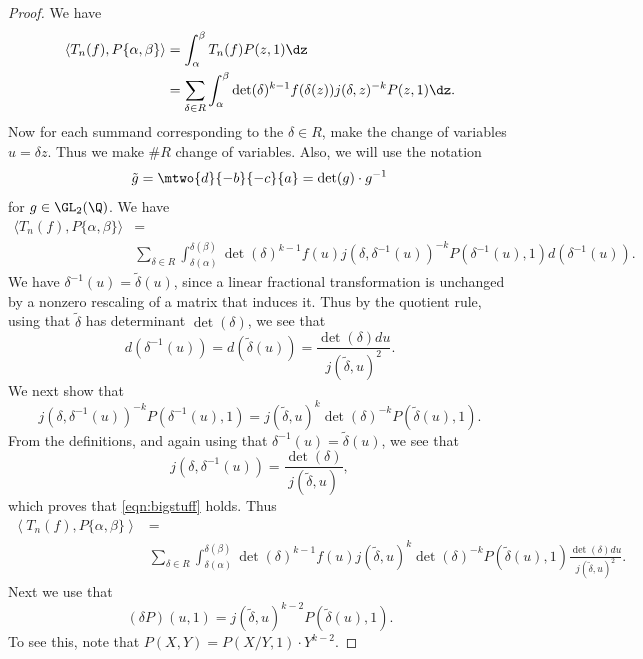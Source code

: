 \begin{proof}
We have
\begin{align*}
\langle T_n(f), P\{\alpha,\beta\}\rangle &= 
    \int_{\alpha}^{\beta} T_n(f) P(z,1) \dz\\
   &= \sum_{\delta\in R} \int_{\alpha}^{\beta}
            \det(\delta)^{k-1} f(\delta(z)) j(\delta,z)^{-k} P(z,1) \dz.
\end{align*}
Now for each summand corresponding to the $\delta\in R$,
make the change of variables $u=\delta z$.  Thus we 
make $\# R$ change of variables.  
Also, we will use the notation $$
\tilde{g} = \mtwo{\hfill{}d}{-b}{-c}{\hfill{}a}
           = \det(g)\cdot g^{-1}$$
for $g\in\GL_2(\Q)$.
We have
\begin{align*}
\langle T_n(f), P\{\alpha,\beta\}\rangle &=\\
   &\!\!\!\!\!\!\!\!\!\!\!\!\!\!\!\!\!\!\!\!
\sum_{\delta \in R}\int_{\delta(\alpha)}^{\delta(\beta)}
             \det(\delta)^{k-1} f(u) j(\delta, \delta^{-1}(u))^{-k}
             P(\delta^{-1}(u), 1) d(\delta^{-1}(u)).
\end{align*}
We have $\delta^{-1}(u) = \tilde{\delta}(u)$,
since a linear fractional transformation is unchanged
by a nonzero rescaling of a matrix that induces it.
Thus by the quotient rule, using that $\tilde{\delta}$
has determinant $\det(\delta)$, we see that
$$
   d(\delta^{-1}(u)) = d(\tilde{\delta}(u))
   = \frac{\det(\delta) du}{j(\tilde{\delta},u)^2}.
$$
We next show that
\begin{equation}\label{eqn:bigstuff}
j(\delta, \delta^{-1}(u))^{-k} P(\delta^{-1}(u),1)
=
j(\tilde{\delta},u)^k \det(\delta)^{-k} P(\tilde{\delta}(u),1).
\end{equation}
From the definitions, and again using that $\delta^{-1}(u)=\tilde{\delta}(u)$, we see that
$$
  j(\delta, \delta^{-1}(u)) = \frac{\det(\delta)}{j(\tilde{\delta}, u)},
$$
which proves that \eqref{eqn:bigstuff} holds.
Thus
\begin{align*}
\left\langle T_n(f), P\{\alpha,\beta\}\right\rangle &= \\
&\!\!\!\!\!\!\!\!\!\!\!\!\!\!\!\!\!\!\!\!\!\!\!
   \sum_{\delta \in R}\int_{\delta(\alpha)}^{\delta(\beta)}
             \det(\delta)^{k-1} f(u) j(\tilde{\delta},u)^{k}
             \det(\delta)^{-k}
             P(\tilde{\delta}(u), 1) \frac{\det(\delta) du}
                                        {j(\tilde{\delta}, u)^2}.
\end{align*}
Next we use that 
$$
  (\delta P)(u,1) = j(\tilde{\delta}, u)^{k-2}
                    P(\tilde{\delta}(u), 1).
$$
To see this, note that $P(X,Y) = P(X/Y, 1)\cdot Y^{k-2}$.

\end{proof}
